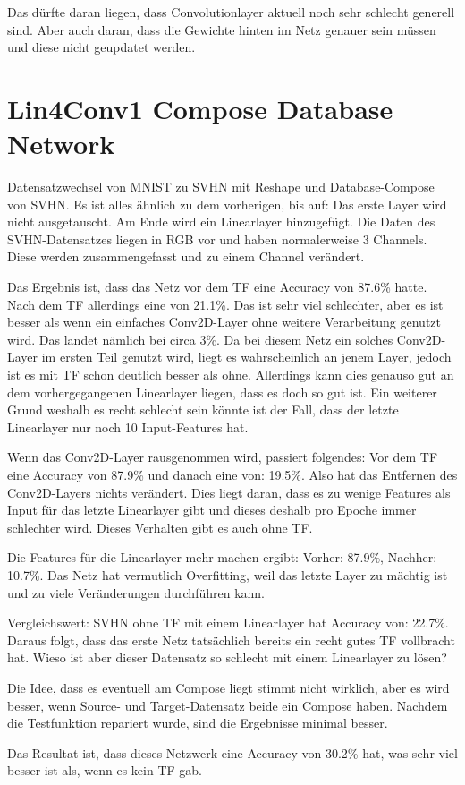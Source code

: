 
    Das dürfte daran liegen, dass Convolutionlayer aktuell noch sehr schlecht generell sind. 
    Aber auch daran, dass die Gewichte hinten im Netz genauer sein müssen und diese nicht 
    geupdatet werden. 

\section{Lin4Conv1 Compose Database Network}
    Datensatzwechsel von MNIST zu SVHN mit Reshape und Database-Compose von SVHN. 
    Es ist alles ähnlich zu dem vorherigen, bis auf: 
    Das erste Layer wird nicht ausgetauscht. Am Ende wird ein Linearlayer hinzugefügt. 
    Die Daten des SVHN-Datensatzes liegen in RGB vor und haben normalerweise 3 Channels. 
    Diese werden zusammengefasst und zu einem Channel verändert.

    Das Ergebnis ist, dass das Netz vor dem TF eine Accuracy von 87.6\% hatte. Nach 
    dem TF allerdings eine von 21.1\%. Das ist sehr viel schlechter, aber es ist besser als 
    wenn ein einfaches Conv2D-Layer ohne weitere Verarbeitung genutzt wird. Das landet 
    nämlich bei circa 3\%. Da bei diesem Netz ein solches Conv2D-Layer im ersten Teil 
    genutzt wird, liegt es wahrscheinlich an jenem Layer, jedoch ist es mit TF schon 
    deutlich besser als ohne. Allerdings kann dies genauso gut an dem vorhergegangenen 
    Linearlayer liegen, dass es doch so gut ist. Ein weiterer Grund weshalb es recht schlecht 
    sein könnte ist der Fall, dass der letzte Linearlayer nur noch 10 Input-Features hat.

    Wenn das Conv2D-Layer rausgenommen wird, passiert folgendes: 
    Vor dem TF eine Accuracy von 87.9\% und danach eine von: 19.5\%. Also hat das Entfernen des 
    Conv2D-Layers nichts verändert. Dies liegt daran, dass es zu wenige Features als Input 
    für das letzte Linearlayer gibt und dieses deshalb pro Epoche immer schlechter wird. 
    Dieses Verhalten gibt es auch ohne TF. 

    Die Features für die Linearlayer mehr machen ergibt: 
    Vorher: 87.9\%, Nachher: 10.7\%. Das Netz hat vermutlich Overfitting, weil das 
    letzte Layer zu mächtig ist und zu viele Veränderungen durchführen kann. 

    Vergleichswert: SVHN ohne TF mit einem Linearlayer hat Accuracy von: 22.7\%.
    Daraus folgt, dass das erste Netz tatsächlich bereits ein recht gutes TF vollbracht hat. 
    Wieso ist aber dieser Datensatz so schlecht mit einem Linearlayer zu lösen?

    Die Idee, dass es eventuell am Compose liegt stimmt nicht wirklich, aber es wird besser, 
    wenn Source- und Target-Datensatz beide ein Compose haben.
    Nachdem die Testfunktion repariert wurde, sind die Ergebnisse minimal besser. 

    Das Resultat ist, dass dieses Netzwerk eine Accuracy von 30.2\% hat, was sehr viel 
    besser ist als, wenn es kein TF gab.
